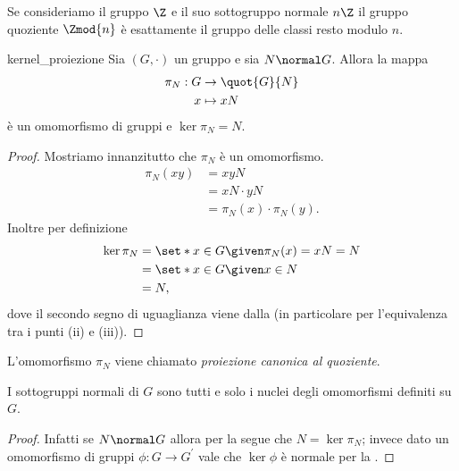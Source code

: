 \begin{example}
    Se consideriamo il gruppo $\Z$ e il suo sottogruppo normale $n\Z$ il gruppo quoziente $\Zmod{n}$ è esattamente il gruppo delle classi resto modulo $n$.
\end{example}

\begin{proposition}{kernel_proiezione}
    Sia $(G, \cdot)$ un gruppo e sia $N \normal G$. Allora la mappa 
    \begin{align} \label{eq:proiezione_gruppi}
        \begin{split}
            \pi_N : G &\to \quot{G}{N}\\
            x &\mapsto xN
        \end{split}
    \end{align}
    è un omomorfismo di gruppi e $\ker \pi_N = N$.
\end{proposition}
\begin{proof}
    Mostriamo innanzitutto che $\pi_N$ è un omomorfismo. \begin{align*}
        \pi_N(xy) &= xyN \\
        &= xN \cdot yN\\
        &= \pi_N(x) \cdot \pi_N(y).
    \end{align*}
    Inoltre per definizione \begin{align*}
        \ker \pi_N &= \set*{x \in G \given \pi_N(x) = xN = N} \\
        &= \set*{x \in G \given x \in N}\\
        &= N,  
    \end{align*} dove il secondo segno di uguaglianza viene dalla  (in particolare per l'equivalenza tra i punti (ii) e (iii)).
\end{proof}

L'omomorfismo $\pi_N$ viene chiamato \emph{proiezione canonica al quoziente}.

\begin{corollary}
    I sottogruppi normali di $G$ sono tutti e solo i nuclei degli omomorfismi definiti su $G$.
\end{corollary}
\begin{proof}
    Infatti se $N \normal G$ allora per la  segue che $N = \ker \pi_N$; invece dato un omomorfismo di gruppi $\phi : G \to G^\prime$ vale che $\ker \phi$ è normale per la .
\end{proof}

